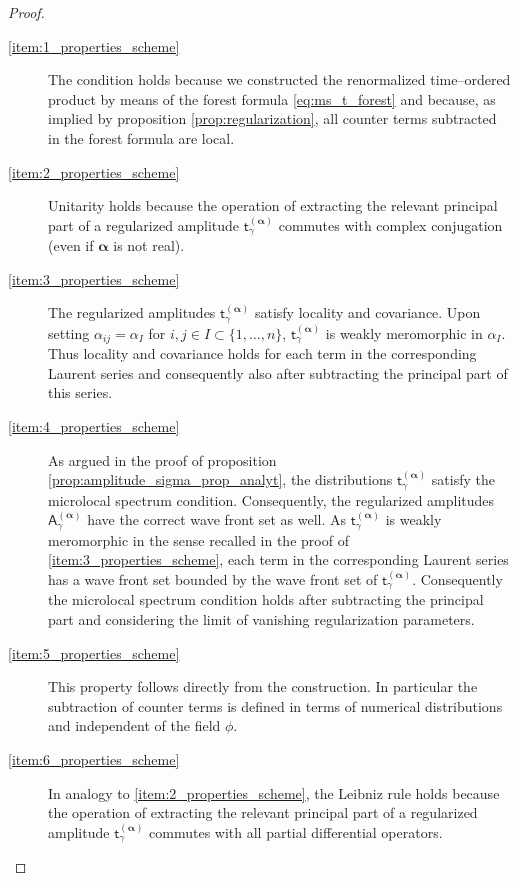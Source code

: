\documentclass[11pt]{book}
\newcommand{\alphabd}{\boldsymbol{\alpha}}
\newcommand{\Asf}{\mathsf{A}}
\newcommand{\tsf}{\mathsf{t}}
\theoremstyle{break}
\begin{document}
\begin{proof}
\begin{description}
\item[\ref{item:1_properties_scheme}] The condition holds because we constructed the renormalized time--ordered product by means of the forest formula \eqref{eq:ms_t_forest} and because, as implied by proposition \ref{prop:regularization}, all counter terms subtracted in the forest formula are local.
%
%
%
%
\item[\ref{item:2_properties_scheme}] Unitarity holds because the operation of extracting the relevant principal part of a regularized amplitude $\tsf^{(\alphabd)}_\gamma$ commutes with complex conjugation (even if $\alphabd$ is not real).
%
%
%
%
\item[\ref{item:3_properties_scheme}] The regularized amplitudes $\tsf^{(\alphabd)}_\gamma$ satisfy locality and covariance. Upon setting $\alpha_{ij}=\alpha_I$ for $i,j\in I\subset \{1,\dots,n\}$, $\tsf^{(\alphabd)}_\gamma$ is weakly meromorphic in $\alpha_I$. Thus locality and covariance holds for each term in the corresponding Laurent series and consequently also after subtracting the principal part of this series.
%
%
%
%
\item[\ref{item:4_properties_scheme}] As argued in the proof of proposition \ref{prop:amplitude_sigma_prop_analyt}, the distributions $\tsf^{(\alphabd)}_\gamma$ satisfy the microlocal spectrum condition. Consequently, the regularized amplitudes $\Asf^{(\alphabd)}_\gamma$ have the correct wave front set as well. As $\tsf^{(\alphabd)}_\gamma$ is weakly meromorphic in the sense recalled in the proof of \ref{item:3_properties_scheme}, each term in the corresponding Laurent series has a wave front set bounded by the wave front set of $\tsf^{(\alphabd)}_\gamma$. Consequently the microlocal spectrum condition holds after subtracting the principal part and considering the limit of vanishing regularization parameters.
%
%
%
%
\item[\ref{item:5_properties_scheme}] This property follows directly from the construction. In particular the subtraction of counter terms is defined in terms of numerical distributions and independent of the field $\phi$.
%
%
%
%
\item[\ref{item:6_properties_scheme}] In analogy to \ref{item:2_properties_scheme}, the Leibniz rule holds because the operation of extracting the relevant principal part of a regularized amplitude $\tsf^{(\alphabd)}_\gamma$ commutes with all partial differential operators.
%
%
%
%

\end{description}
\end{proof}
\end{document}
